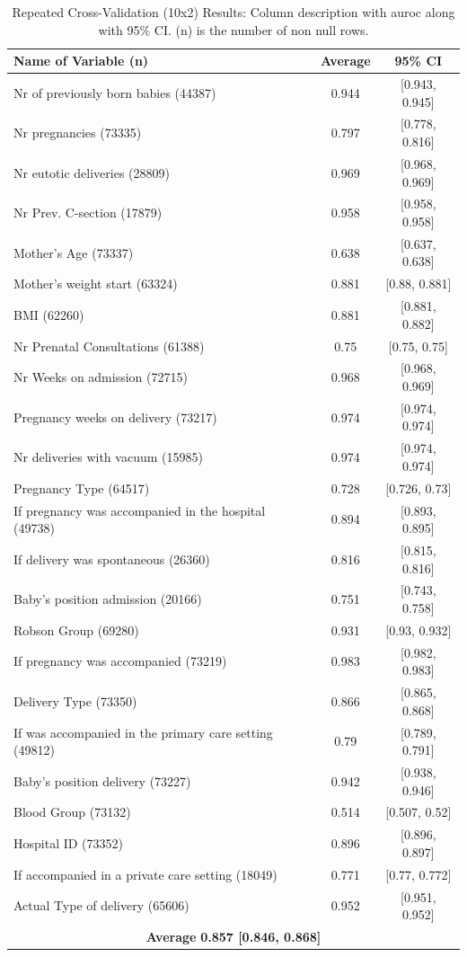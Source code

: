 \begin{table}[h!]
    \caption{Repeated Cross-Validation (10x2) Results: Column description with \ac{auroc} along with 95\% CI. (n) is the number of non null rows.} \label{tab:result_auc} 
   
   \renewcommand{\arraystretch}{1.2}
   \centering
   \begin{tabular} {lcc }
    \toprule
    Name of Variable (n) &               Average &               95\% CI \\
 \midrule
   Nr of previously born babies (44387) & 0.944 & [0.943, 0.945] \\
   Nr pregnancies (73335) & 0.797 & [0.778, 0.816] \\
   Nr eutotic deliveries (28809) & 0.969 & [0.968, 0.969] \\
   Nr Prev. C-section (17879)& 0.958 & [0.958, 0.958] \\
   Mother’s Age (73337) & 0.638 & [0.637, 0.638] \\
   Mother’s weight start (63324)& 0.881 & [0.88, 0.881] \\
   BMI (62260) & 0.881 & [0.881, 0.882] \\
   Nr Prenatal Consultations (61388) & 0.75 & [0.75, 0.75] \\
   Nr Weeks on admission (72715) & 0.968 & [0.968, 0.969] \\
   Pregnancy weeks on delivery (73217) & 0.974 & [0.974, 0.974] \\
   Nr deliveries with vacuum (15985) & 0.974 & [0.974, 0.974] \\
   Pregnancy Type (64517) & 0.728 & [0.726, 0.73]\\
   If pregnancy was accompanied in the hospital (49738)& 0.894 & [0.893, 0.895] \\
    If delivery was spontaneous (26360) & 0.816 & [0.815, 0.816] \\
    Baby’s position admission (20166)& 0.751 & [0.743, 0.758] \\
    Robson Group (69280) & 0.931 & [0.93, 0.932] \\
    If pregnancy was accompanied (73219) & 0.983 & [0.982, 0.983] \\
    Delivery Type (73350)& 0.866 & [0.865, 0.868] \\
    If was accompanied in the primary care setting (49812) & 0.79 & [0.789, 0.791] \\
    Baby’s position delivery (73227) & 0.942 & [0.938, 0.946] \\
    Blood Group (73132) & 0.514 & [0.507, 0.52] \\
    Hospital ID (73352) & 0.896 & [0.896, 0.897] \\
    If accompanied in a private care setting (18049) & 0.771 & [0.77, 0.772] \\
    Actual Type of delivery (65606) & 0.952 & [0.951, 0.952] \\
   \hline
    \multicolumn{3}{c}{\textbf{Average}  \textbf{0.857 [0.846, 0.868]}} \\
   
   \hline
   \end{tabular}
   \end{table}

